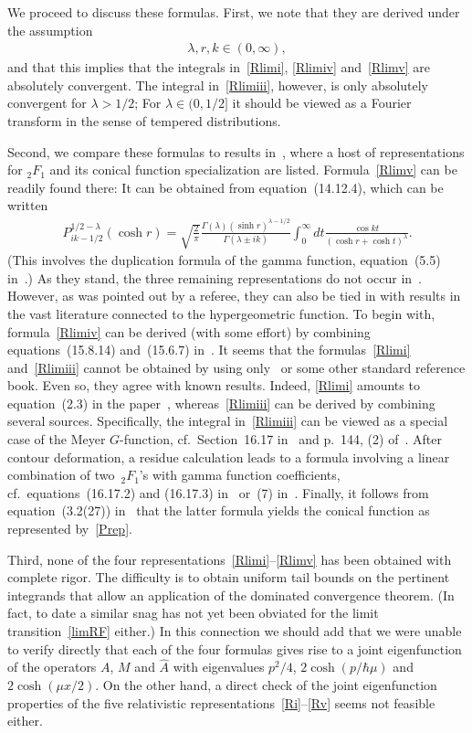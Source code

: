 \documentclass[pdftex]{sigma}
\numberwithin{equation}{section}
\begin{document}
We proceed to discuss these formulas. First, we note that they are derived under the assumption
\begin{gather}
\lambda,r,k\in(0,\infty),
 \end{gather}
and that this implies that the integrals in~\eqref{Rlimi}, \eqref{Rlimiv} and~\eqref{Rlimv} are absolutely convergent.
The integral in~\eqref{Rlimiii}, however, is only absolutely convergent for $\lambda>1/2$; For $\lambda\in(0,1/2]$ it should be viewed as a Fourier transform in the sense of tempered distributions.

Second, we compare these formulas to results in~\cite{dlmf}, where a host of representations for $_2F_1$ and its conical function specialization are listed. Formula~\eqref{Rlimv} can be readily found there: It can be obtained from equation~(14.12.4), which can be written
\begin{gather}\label{Prep}
P_{ik-1/2}^{1/2-\lambda}(\cosh r)=\sqrt{\frac{2}{\pi}} \frac{\Gamma(\lambda)(\sinh r)^{\lambda-1/2}}{\Gamma(\lambda\pm ik)}
\int_{0}^{\infty}dt\frac{\cos kt}{(\cosh r +\cosh t)^{\lambda}}.
\end{gather}
(This involves the duplication formula of the gamma function, equation~(5.5) in~\cite{dlmf}.) As they stand, the three remaining representations do not occur in~\cite{dlmf}. However, as was pointed out by a referee, they can also be tied in with results in the vast literature connected to the hypergeometric function. To begin with, formula~\eqref{Rlimiv} can be derived (with some ef\/fort) by combining equations~(15.8.14) and~(15.6.7) in~\cite{dlmf}. It seems that the formulas~\eqref{Rlimi} and~\eqref{Rlimiii} cannot be obtained by using only~\cite{dlmf} or some other standard reference book. Even so, they agree with known results. Indeed, \eqref{Rlimi} amounts to equation~(2.3) in the paper~\cite{bako}, whereas~\eqref{Rlimiii} can be derived by combining several sources. Specif\/ically, the integral in~\eqref{Rlimiii} can be viewed as a special case of the Meyer $G$-function, cf.~Section~16.17 in~\cite{dlmf} and p.~144, (2) of~\cite{luke}. After contour deformation, a residue calculation leads to a formula involving a linear combination of two~$_2F_1$'s with gamma function coef\/f\/icients, cf.~equations~(16.17.2) and (16.17.3) in~\cite{dlmf} or~(7) in~\cite{luke}. Finally, it follows from equation~(3.2(27)) in~\cite{erd} that the latter formula yields the conical function as represented by~\eqref{Prep}.

Third, none of the four representations~\eqref{Rlimi}--\eqref{Rlimv} has been obtained with complete rigor. The diff\/iculty is to obtain uniform tail bounds on the pertinent integrands that allow an application of the dominated convergence theorem. (In fact, to date a similar snag has not yet been obviated for the limit transition~\eqref{limRF} either.)
In this connection we should add that we were unable to verify directly that each of the four formulas gives rise to a joint eigenfunction of the operators $A$, $M$ and $\hat{A}$ with eigenvalues $p^2/4$, $2\cosh(p/\hbar\mu)$ and $2\cosh(\mu x/2)$. On the other hand, a direct check of the joint eigenfunction properties of the f\/ive relativistic representations~\eqref{Ri}--\eqref{Rv} seems not feasible either.
\end{document}

